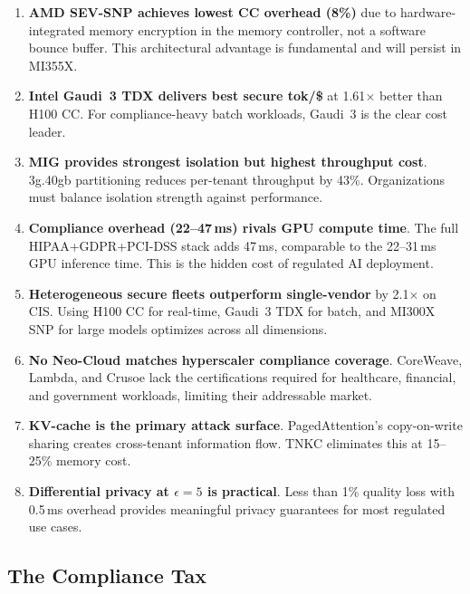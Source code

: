 \documentclass[conference,10pt]{IEEEtran}
\begin{document}
\begin{enumerate}
\item \textbf{AMD SEV-SNP achieves lowest CC overhead (8\%)} due to hardware-integrated memory encryption in the memory controller, not a software bounce buffer. This architectural advantage is fundamental and will persist in MI355X.

\item \textbf{Intel Gaudi~3 TDX delivers best secure tok/\$} at 1.61$\times$ better than H100 CC. For compliance-heavy batch workloads, Gaudi~3 is the clear cost leader.

\item \textbf{MIG provides strongest isolation but highest throughput cost}. 3g.40gb partitioning reduces per-tenant throughput by 43\%. Organizations must balance isolation strength against performance.

\item \textbf{Compliance overhead (22--47\,ms) rivals GPU compute time}. The full HIPAA+GDPR+PCI-DSS stack adds 47\,ms, comparable to the 22--31\,ms GPU inference time. This is the hidden cost of regulated AI deployment.

\item \textbf{Heterogeneous secure fleets outperform single-vendor} by 2.1$\times$ on CIS. Using H100 CC for real-time, Gaudi~3 TDX for batch, and MI300X SNP for large models optimizes across all dimensions.

\item \textbf{No Neo-Cloud matches hyperscaler compliance coverage}. CoreWeave, Lambda, and Crusoe lack the certifications required for healthcare, financial, and government workloads, limiting their addressable market.

\item \textbf{KV-cache is the primary attack surface}. PagedAttention's copy-on-write sharing creates cross-tenant information flow. TNKC eliminates this at 15--25\% memory cost.

\item \textbf{Differential privacy at $\epsilon=5$ is practical}. Less than 1\% quality loss with 0.5\,ms overhead provides meaningful privacy guarantees for most regulated use cases.
\end{enumerate}

\subsection{The Compliance Tax}
\end{document}
